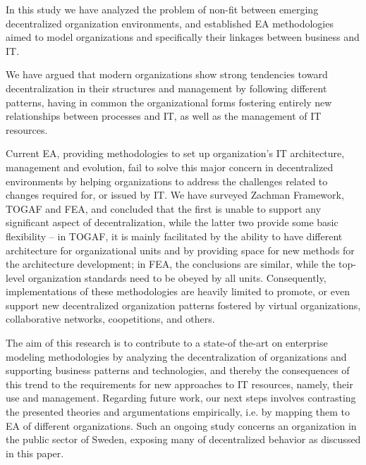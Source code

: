 In this study we have analyzed the problem of non-fit between emerging
decentralized organization environments, and established EA methodologies
aimed to model organizations and specifically their linkages between
business and IT.

We have argued that modern organizations show strong tendencies toward
decentralization in their structures and management by following different
patterns, having in common the organizational forms fostering entirely new
relationships between processes and IT, as well as the management of IT
resources.

Current EA, providing methodologies to set up organization’s IT
architecture, management and evolution, fail to solve this major concern
in decentralized environments by helping organizations to address the
challenges related to changes required for, or issued by IT. We have
surveyed Zachman Framework, TOGAF and FEA, and concluded that the first is
unable to support any significant aspect of decentralization, while the
latter two provide some basic flexibility – in TOGAF, it is mainly
facilitated by the ability to have different architecture for
organizational units and by providing space for new methods for the
architecture development; in FEA, the conclusions are similar, while the
top-level organization standards need to be obeyed by all units.
Consequently, implementations of these methodologies are heavily limited
to promote, or even support new decentralized organization patterns
fostered by virtual organizations, collaborative networks, coopetitions,
and others.

The aim of this research is to contribute to a state-of the-art on
enterprise modeling methodologies by analyzing the decentralization of
organizations and supporting business patterns and technologies, and
thereby the consequences of this trend to the requirements for new
approaches to IT resources, namely, their use and management.
Regarding future work, our next steps involves contrasting the presented
theories and argumentations empirically, i.e. by mapping them to EA of
different organizations. Such an ongoing study concerns an organization in
the public sector of Sweden, exposing many of decentralized behavior as
discussed in this paper.